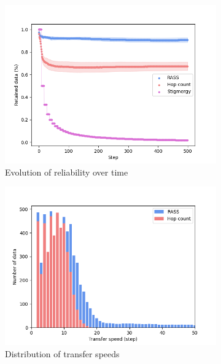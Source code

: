 \documentclass[sigconf]{aamas}
\begin{document}
\begin{figure}
    \centering
    \begin{subfigure}{0.30\textwidth}
        \includegraphics[width=\textwidth]{figures/lennard_reliability.png}
        \caption{Evolution of reliability over time}
        \label{results:lennard_100_reliability}
    \end{subfigure}
    \begin{subfigure}{0.30\textwidth}
        \includegraphics[width=\textwidth]{figures/lennard_speed.png}
        \caption{Distribution of transfer speeds}
        \label{results:lennard_100_speed}
    \end{subfigure}
    \begin{subfigure}{0.30\textwidth}

\end{subfigure}
\end{figure}
\end{document}
